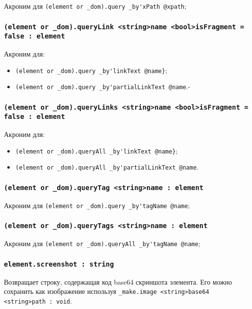 \documentclass[a4paper, 14pt]{extarticle}
\newenvironment{icItems}
	{ \begin{itemize} [noitemsep,nolistsep] }
	{ \end{itemize} }
\begin{document}
Акроним для \lstinline|(element or _dom).query _by'xPath @xpath|;

\subsubsection{\lstinline|(element or _dom).queryLink <string>name <bool>isFragment = false : element|}

Акроним для:
\begin{icItems}
	\item \lstinline|(element or _dom).query _by'linkText @name}|;
	\item \lstinline|(element or _dom).query _by'partialLinkText @name|.-
\end{icItems}

\subsubsection{\lstinline|(element or _dom).queryLinks <string>name <bool>isFragment = false : element|}

Акроним для:
\begin{icItems}
	\item \lstinline|(element or _dom).queryAll _by'linkText @name}|;
	\item \lstinline|(element or _dom).queryAll _by'partialLinkText @name|.
\end{icItems}

\subsubsection{\lstinline|(element or _dom).queryTag <string>name : element|}

Акроним для \lstinline|(element or _dom).query _by'tagName @name|;

\subsubsection{\lstinline|(element or _dom).queryTags <string>name : element|}

Акроним для \lstinline|(element or _dom).queryAll _by'tagName @name|;

\subsubsection{\lstinline|element.screenshot : string|}

Возвращает строку, содержащая код base64 скриншота элемента. Его можно сохранить как изображение используя \lstinline|_make.image <string>base64 <string>path : void|.
\end{document}
